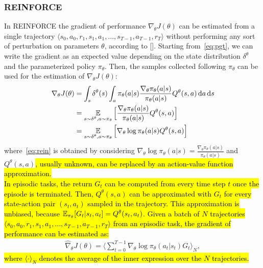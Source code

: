 \subsubsection{REINFORCE} \label{subsec:rein}
In REINFORCE the gradient of performance $\nabla_{\theta}J(\theta)$ can be estimated from a single trajectory $\langle s_0, a_0, r_1, s_1, a_1, ..., s_{T-1}, a_{T-1}, r_{T} \rangle$ without performing any sort of perturbation on parameters $\theta$, according to [\cite{Williams1992SimpleSG}]. Starting from~\eqref{eq:pgt}, we can write the gradient as an expected value depending on the state distribution $\delta^{\theta}$ and the parameterized policy $\pi_{\theta}$. Then, the samples collected following $\pi_{\theta}$ can be used for the estimation of $\nabla_{\theta}J(\theta)$: 
\begin{align}
\nabla_{\theta}J(\theta) &= \int_s \delta^{\theta}(s) \int_a \pi_{\theta}(a|s) \frac{\nabla_{\theta} \pi_{\theta}(a|s)}{\pi_{\theta}(a|s)} Q^{\theta}(s,a) \,\mathrm{d} a \,\mathrm{d} s \nonumber\\
&= \operatorname*{\mathbb{E}}_{s \sim \delta^{\theta}, a \sim \pi_{\theta}} \Big[ \frac{\nabla_{\theta} \pi_{\theta}(a|s)}{\pi_{\theta}(a|s)} Q^{\theta}(s,a) \Big] \nonumber\\
&= \operatorname*{\mathbb{E}}_{s \sim \delta^{\theta}, a \sim \pi_{\theta}} \Big[ \nabla_{\theta} \log\pi_{\theta}(a|s) Q^{\theta}(s,a) \Big] \label{eq:rein}
\end{align}
where~\eqref{eq:rein} is obtained by considering $\nabla_{\theta} \log\pi_{\theta}(a|s) = \frac{\nabla_{\theta} \pi_{\theta}(a|s)}{\pi_{\theta}(a|s)}$ and $Q^{\theta}(s, a)$\hl{, usually unknown, can be replaced by an action-value function approximation.}\\
\newline
\hl{In episodic tasks, the return $G_t$ can be computed from every time step $t$ once the episode is terminated. Then, $Q^{\theta}(s, a)$ can be approximated with $G_{t}$ for every state-action pair $(s_t, a_t)$ sampled in the trajectory. This approximation is unbiased, because $\operatorname*{\mathbb{E}}_{\pi_{\theta}}[G_t | s_t, a_t] = Q^{\theta}(s_t, a_t)$.
Given a batch of $N$ trajectories $\langle s_0, a_0, r_1, s_1, a_1, ..., s_{T-1}, a_{T-1}, r_{T} \rangle$ from an episodic task, the gradient of performance can be estimated as:}
\begin{align}
	\widehat{\nabla}_{\theta}J(\theta) = \Big\langle \sum_{t=0}^{T-1} \nabla_{\theta} \log\pi_{\theta}(a_t|s_t) G_{t} \Big\rangle_{N}, \label{eq:estrein}
\end{align}
\hl{where $\langle \cdot \rangle_{N}$ denotes the average of the inner expression over the $N$ trajectories.}\\
